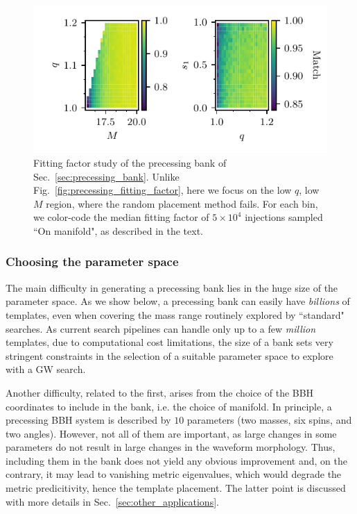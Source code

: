 \documentclass[twocolumn,showpacs,preprintnumbers,nofootinbib,prd,
superscriptaddress,10pt]{revtex4-2}
\begin{document}
\begin{figure}[t]
	\centering
	\includegraphics[scale = 1.]{precessing_injections_lowM}
	\caption{Fitting factor study of the precessing bank of Sec.~\ref{sec:precessing_bank}. Unlike Fig.~\ref{fig:precessing_fitting_factor}, here we focus on the low $q$, low $M$ region, where the random placement method fails. For each bin, we color-code the median fitting factor of $5 \times 10^4$ injections sampled ``On manifold", as described in the text.}
	\label{fig:precessing_fitting_factor_zoom}
\end{figure}

\subsubsection{Choosing the parameter space}

The main difficulty in generating a precessing bank lies in the huge size of the parameter space. As we show below, a precessing bank can easily have {\it billions} of templates, even when covering the mass range routinely explored by ``standard" searches. As current search pipelines can handle only up to a few {\it million} templates, due to computational cost limitations, the size of a bank sets very stringent constraints in the selection of a suitable parameter space to explore with a GW search.

Another difficulty, related to the first, arises from the choice of the BBH coordinates to include in the bank, i.e. the choice of manifold.
In principle, a precessing BBH system is described by $10$ parameters (two masses, six spins, and two angles).
However, not all of them are important, as large changes in some parameters do not result in large changes in the waveform morphology. Thus, including them in the bank does not yield any obvious improvement and, on the contrary, it may lead to vanishing metric eigenvalues, which would degrade the metric predicitivity, hence the template placement. The latter point is discussed with more details in Sec.~\ref{sec:other_applications}.
\end{document}
